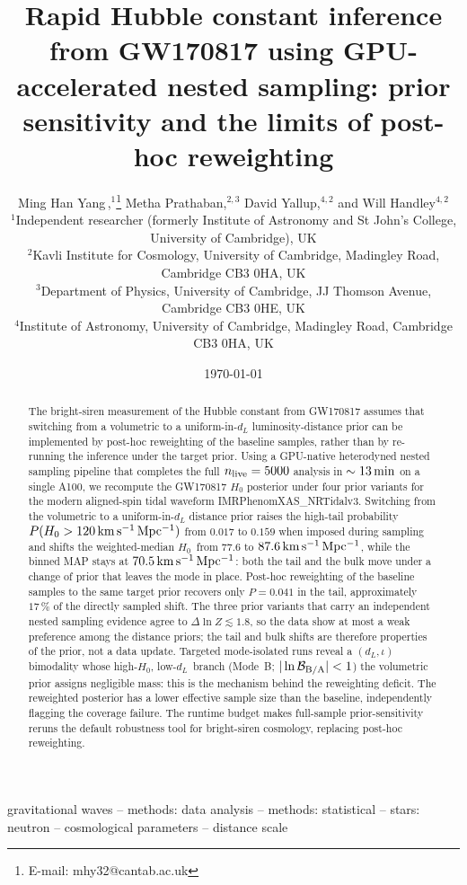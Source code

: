 \documentclass[usenatbib]{mnras}
\title[Rapid GW170817 \hzero inference]{Rapid Hubble constant inference from GW170817 using GPU-accelerated nested sampling: prior sensitivity and the limits of post-hoc reweighting}
\author[Yang, Prathaban, Yallup \& Handley]{
Ming Han Yang\,\orcidlink{0009-0002-7298-7740},$^{1}$\thanks{E-mail: mhy32@cantab.ac.uk}
Metha Prathaban,$^{2,3}$
David Yallup,$^{4,2}$
and Will Handley$^{4,2}$
\\
$^{1}$Independent researcher (formerly Institute of Astronomy and St John's College, University of Cambridge), UK\\
$^{2}$Kavli Institute for Cosmology, University of Cambridge, Madingley Road, Cambridge CB3 0HA, UK\\
$^{3}$Department of Physics, University of Cambridge, JJ Thomson Avenue, Cambridge CB3 0HE, UK\\
$^{4}$Institute of Astronomy, University of Cambridge, Madingley Road, Cambridge CB3 0HA, UK
}
\date{\today}
\newcommand{\kmsmpc}{\ensuremath{\,\rm km\,s^{-1}\,Mpc^{-1}}\xspace}
\newcommand{\hzero}{\ensuremath{H_{0}}\xspace}
\newcommand{\dL}{\ensuremath{d_{L}}\xspace}
\begin{document}
\label{firstpage}
\pagerange{\pageref{firstpage}--\pageref{lastpage}}
\maketitle

\begin{abstract}
The bright-siren measurement of the Hubble constant from GW170817 \citep{Abbott2017H0} assumes that switching from a volumetric to a uniform-in-$d_L$ luminosity-distance prior can be implemented by post-hoc reweighting of the baseline samples, rather than by re-running the inference under the target prior. Using a GPU-native heterodyned nested sampling pipeline that completes the full $n_{\rm live}=5000$ analysis in $\sim 13\,\rm min$ on a single A100, we recompute the GW170817 \hzero posterior under four prior variants for the modern aligned-spin tidal waveform IMRPhenomXAS\_NRTidalv3. Switching from the volumetric to a uniform-in-$d_L$ distance prior raises the high-tail probability $P(\hzero>120\kmsmpc)$ from $0.017$ to $0.159$ when imposed during sampling and shifts the weighted-median \hzero\ from $77.6$ to $87.6\kmsmpc$, while the binned MAP stays at $70.5\kmsmpc$: both the tail and the bulk move under a change of prior that leaves the mode in place. Post-hoc reweighting of the baseline samples to the same target prior recovers only $P=0.041$ in the tail, approximately $17\,\%$ of the directly sampled shift. The three prior variants that carry an independent nested sampling evidence agree to $\Delta\ln Z\lesssim 1.8$, so the data show at most a weak preference among the distance priors; the tail and bulk shifts are therefore properties of the prior, not a data update. Targeted mode-isolated runs reveal a $(\dL,\iota)$ bimodality whose high-\hzero, low-\dL\ branch (Mode~B; $|\ln\mathcal{B}_{\rm B/A}|<1$) the volumetric prior assigns negligible mass: this is the mechanism behind the reweighting deficit. The reweighted posterior has a lower effective sample size than the baseline, independently flagging the coverage failure. The runtime budget makes full-sample prior-sensitivity reruns the default robustness tool for bright-siren cosmology, replacing post-hoc reweighting.
\end{abstract}

\begin{keywords}
gravitational waves -- methods: data analysis -- methods: statistical -- stars: neutron -- cosmological parameters -- distance scale
\end{keywords}
\end{document}
